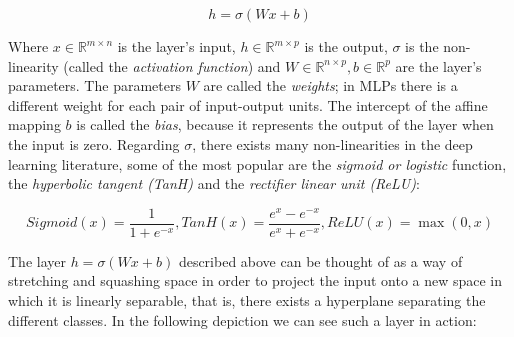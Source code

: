 \documentclass[../main.tex]{subfiles}
\begin{document}
    \begin{equation}
        h = \sigma(Wx + b)
    \end{equation}

    Where $x \in \mathbb{R}^{m \times n}$ is the layer's input, $h \in \mathbb{R}^{m \times p}$ is the output,
    $\sigma$ is the non-linearity (called the \textit{activation function}) and
    $W \in \mathbb{R}^{n \times p}, b \in \mathbb{R}^{p}$ are the layer's parameters.
    The parameters $W$ are called the \textit{weights}; in MLPs there is a different weight for each pair of input-output units.
    The intercept of the affine mapping $b$ is called the \textit{bias}, because it represents the output of the layer when
    the input is zero. Regarding $\sigma$, there exists many non-linearities in the deep learning literature, some of the most popular are the
    \textit{sigmoid or logistic} function, the \textit{hyperbolic tangent (TanH)} and the \textit{rectifier linear unit (ReLU)}:

    \begin{equation}
        Sigmoid(x) = \frac{1}{1 + e^{-x}}, TanH(x) = \frac{e^{x} - e^{-x}}{e^{x} + e^{-x}}, ReLU(x) = \max(0, x)
    \end{equation}

    The layer $h = \sigma(Wx + b)$ described above can be thought of as a way of stretching and squashing space in order to project
    the input onto a new space in which it is linearly separable, that is, there exists a hyperplane separating the different classes.
    In the following depiction we can see such a layer in action:
\end{document}
